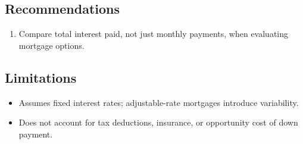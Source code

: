 \documentclass[11pt, a4paper]{article}
\begin{document}


\subsection{Recommendations}

\begin{enumerate}
  \item Compare total interest paid, not just monthly payments, when evaluating mortgage options.
\end{enumerate}

\subsection{Limitations}

\begin{polyawarnbox}
\begin{itemize}
  \item Assumes fixed interest rates; adjustable-rate mortgages introduce variability.
  \item Does not account for tax deductions, insurance, or opportunity cost of down payment.
\end{itemize}
\end{polyawarnbox}

\end{document}
